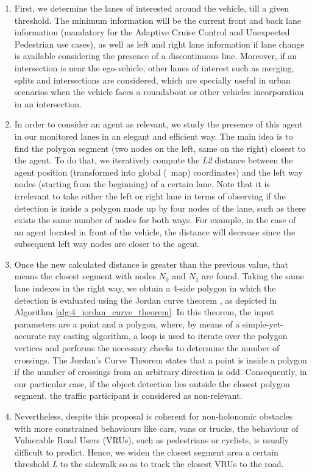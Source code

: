\begin{enumerate}
	
	\item First, we determine the lanes of interested around the vehicle, till a given threshold. The minimum information will be the current front and back lane information (mandatory for the Adaptive Cruise Control and Unexpected Pedestrian use cases), as well as left and right lane information if lane change is available considering the presence of a discontinuous line. Moreover, if an intersection is near the ego-vehicle, other lanes of interest such as merging, splits and intersections are considered, which are specially useful in urban scenarios when the vehicle faces a roundabout or other vehicles incorporation in an intersection.
	
	\item In order to consider an agent as relevant, we study the presence of this agent in our monitored lanes in an elegant and efficient way. The main idea is to find the polygon segment (two nodes on the left, same on the right) closest to the agent. To do that, we iteratively compute the \textit{L2} distance between the agent position (transformed into global (\aka \ map) coordinates) and the left way nodes (starting from the beginning) of a certain lane. Note that it is irrelevant to take either the left or right lane in terms of observing if the detection is inside a polygon made up by four nodes of the lane, such as there exists the same number of nodes for both ways. For example, in the case of an agent located in front of the vehicle, the distance will decrease since the subsequent left way nodes are closer to the agent. 
	
	\item Once the new calculated distance is greater than the previous value, that means the closest segment with nodes \textit{$N_0$} and \textit{$N_1$} are found. Taking the same lane indexes in the right way, we obtain a 4-side polygon in which the detection is evaluated using the Jordan curve theorem \cite{tverberg1980proof}, as depicted in Algorithm \ref{alg:4_jordan_curve_theorem}. In this theorem, the input parameters are a point and a polygon, where, by means of a simple-yet-accurate ray casting algorithm, a loop is used to iterate over the polygon vertices and performs the necessary checks to determine the number of crossings. The Jordan's Curve Theorem states that a point is inside a polygon if the number of crossings from an arbitrary direction is odd. Consequently, in our particular case, if the object detection lies outside the closest polygon segment, the traffic participant is considered as non-relevant.
	
	\item Nevertheless, despite this proposal is coherent for non-holonomic obstacles with more constrained behaviours like cars, vans or trucks, the behaviour of Vulnerable Road Users (VRUs), such as pedestrians or cyclists, is usually difficult to predict. Hence, we widen the closest segment area a certain threshold \textit{L} to the sidewalk so as to track the closest VRUs to the road.
	
\end{enumerate}

